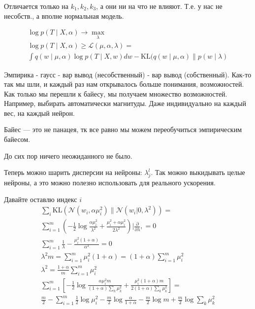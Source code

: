 \documentclass{minimal}
\begin{document}
Отличается только на $k_1,k_2,k_3$, а они ни на что не влияют.
Т.е. у нас не несобств., а вполне нормальная модель.

\begin{gather*}
  \log p(T\mid X,\alpha)\rightarrow\max_\lambda\\
  \log p(T\mid X,\alpha) \geq \mathcal{L}(\mu,\alpha,\lambda)=\\
  \int q(w\mid \mu, \alpha)\log p(T\mid X,w)dw-\mathrm{KL}(q(w\mid \mu, \alpha)\|p(w\mid \lambda)
\end{gather*}

Эмпирика - гаусс - вар вывод (несобственный) - вар вывод (собственный). Как-то так мы шли, и каждый раз нам открывалось больше понимания, возможностей. Как только мы перешли к байесу, мы получаем множество возможностей. Например, выбирать автоматически магнитуды. Даже индивидуально на каждый вес, на каждый нейрон.

Байес --- это не панацея, тк все равно мы можем переобучиться эмпирическим байесом.

До сих пор ничего неожиданного не было.

Теперь можно шарить дисперсии на нейроны: $\lambda_j^{l}$. Так можно выкидывать целые нейроны, а это можно полезно использовать для реального ускорения.

Давайте оставлю индекс $i$
\begin{gather*}
  \sum_i \mathrm{KL}\left(\mathcal{N}\left(w_i,\alpha \mu^2_i\right)\|\mathcal{N}\left(w_i|0,\lambda^2\right)\right)=\\
  \sum_{i=1}^{m} {\left(-\frac{1}{2}\log\frac{\alpha\mu_i^2}{\lambda^2}+\frac{\mu_i^2+\alpha\mu_i^2}{2\lambda^2}\right)} \Bigg | \frac{\partial }{\partial \lambda}, =0\\
  \sum_{i=1}^{m} {\frac{1}{\lambda}-\frac{\mu_i^2(1+\alpha)}{\alpha^3}}=0\\
  \lambda^2m=\sum_{i=1}^{m} {\mu_i^2(1+\alpha)=(1+\alpha)\sum_{i=1}^{m} {\mu_i^2}}\\
  \lambda^2=\frac{1+\alpha}{m}\sum_{i=1}^{m} {\mu_i^2}\\
  \sum_{i=1}^{m} \left[{-\frac{1}{2}\log\frac{\alpha\mu_i^2m}{(1+\alpha)\sum_{k}^{} {\mu_k^2}}+\frac{\mu_i^2(1+\alpha)m}{2(1+\alpha)\sum_{k}^{} {\mu_k^2}}}\right]=\\
  \frac{m}{2}-\sum_{i=1}^{m} {\frac{1}{2}\log \mu_i^2-\frac{m}{2}\log \frac{\alpha}{1+\alpha}-\frac{m}{2}\log m+\frac{m}{2}\log \sum_{k}^{} {\mu_k^2}}
\end{gather*}
\end{document}

